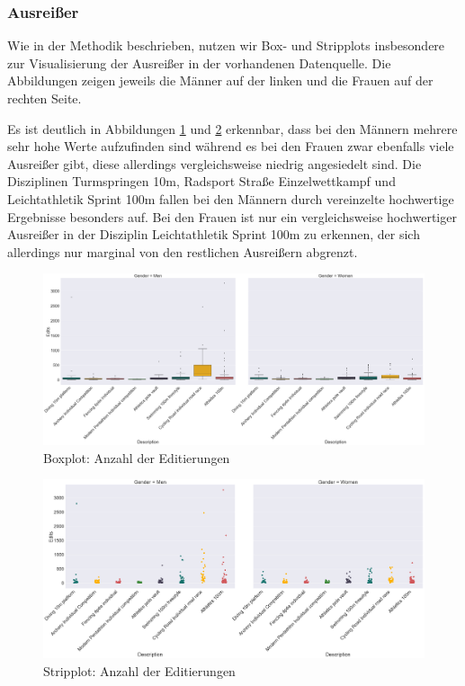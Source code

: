 \documentclass[11pt]{article}
\begin{document}
\subsubsection{Ausreißer}
Wie in der Methodik beschrieben, nutzen wir Box- und Stripplots insbesondere zur Visualisierung der Ausreißer in der vorhandenen Datenquelle. Die Abbildungen zeigen jeweils die Männer auf der linken und die Frauen auf der rechten Seite.

Es ist deutlich in Abbildungen \ref{fig:editcountBoxPlot} und \ref{fig:editcountStripPlot} erkennbar, dass bei den Männern mehrere sehr hohe Werte aufzufinden sind während es bei den Frauen zwar ebenfalls viele Ausreißer gibt, diese allerdings vergleichsweise niedrig angesiedelt sind. Die Disziplinen Turmspringen 10m, Radsport Straße Einzelwettkampf und  Leichtathletik Sprint 100m fallen bei den Männern durch vereinzelte hochwertige Ergebnisse besonders auf. Bei den Frauen ist nur ein vergleichsweise hochwertiger Ausreißer in der Disziplin Leichtathletik Sprint 100m zu erkennen, der sich allerdings nur marginal von den restlichen Ausreißern abgrenzt.

\begin{figure}
\includegraphics[width=1\textwidth]{figures/editcount_boxplot.png}
\caption[Boxplot: Anzahl der Editierungen]{Boxplot: Anzahl der Editierungen}
\label{fig:editcountBoxPlot}
\end{figure}

\begin{figure}
\includegraphics[width=1\textwidth]{figures/editcount_stripplot.png}
\caption[Stripplot: Anzahl der Editierungen]{Stripplot: Anzahl der Editierungen}
\label{fig:editcountStripPlot}
\end{figure}
\end{document}
